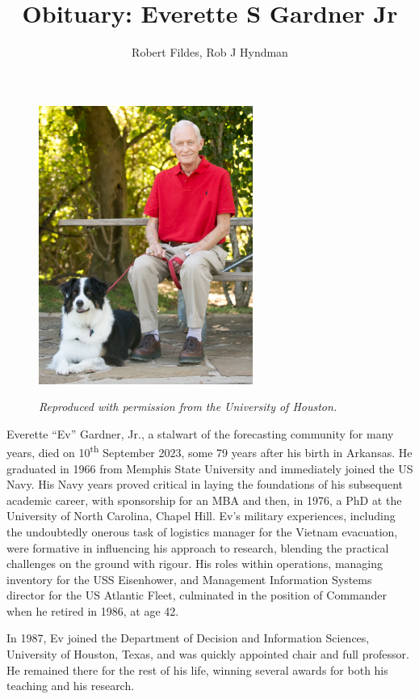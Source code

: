 \documentclass[11pt, a4paper]{article}
\begin{document}
\title{Obituary: Everette S Gardner Jr}
\author{Robert Fildes, Rob J Hyndman}
\maketitle

\begin{figure}[!ht]\centering
\includegraphics[width=7cm]{Ev_pic.jpg}
\centerline{\itshape Reproduced with permission from the University of Houston.}
\end{figure}

Everette ``Ev'' Gardner, Jr., a stalwart of the forecasting community for many years, died on 10\textsuperscript{th} September 2023, some 79 years after his birth in Arkansas. He graduated in 1966 from Memphis State University and immediately joined the US Navy. His Navy years proved critical in laying the foundations of his subsequent academic career, with sponsorship for an MBA and then, in 1976, a PhD \citep{phd} at the University of North Carolina, Chapel Hill. Ev's military experiences, including the undoubtedly onerous task of logistics manager for the Vietnam evacuation, were formative in influencing his approach to research, blending the practical challenges on the ground with rigour. His roles within operations, managing inventory for the USS Eisenhower, and Management Information Systems director for the US Atlantic Fleet, culminated in the position of Commander when he retired in 1986, at age 42.

In 1987, Ev joined the Department of Decision and Information Sciences, University of  Houston, Texas, and was quickly appointed chair and full professor. He remained there for the rest of his life, winning several awards for both his teaching and his research.
\end{document}
